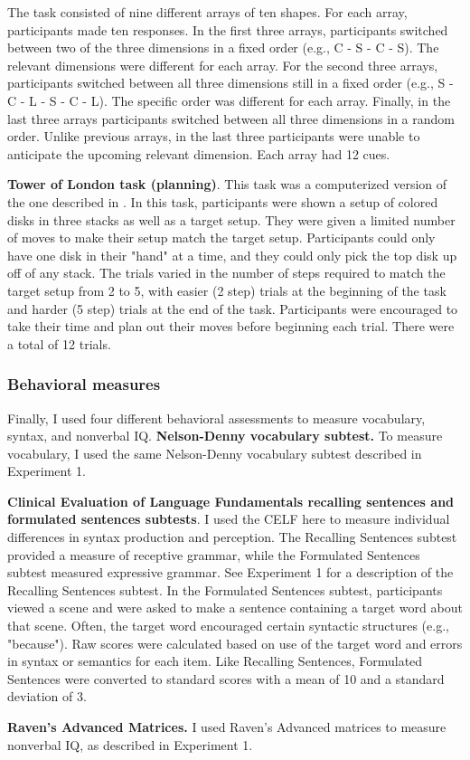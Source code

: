 \documentclass[../dissertation.tex]{subfiles}
\begin{document}
The task consisted of nine different arrays of ten shapes. For each array, participants made ten responses. In the first three arrays, participants switched between two of the three dimensions in a fixed order (e.g., C - S - C - S). The relevant dimensions were different for each array. For the second three arrays, participants switched between all three dimensions still in a fixed order (e.g., S - C - L - S - C - L). The specific order was different for each array. Finally, in the last three arrays participants switched between all three dimensions in a random order. Unlike previous arrays, in the last three participants were unable to anticipate the upcoming relevant dimension. Each array had 12 cues. \par
\textbf{Tower of London task (planning)}. This task was a computerized version of the one described in \citet{Shallice1982}. In this task, participants were shown a setup of colored disks in three stacks as well as a target setup. They were given a limited number of moves to make their setup match the target setup. Participants could only have one disk in their "hand" at a time, and they could only pick the top disk up off of any stack. The trials varied in the number of steps required to match the target setup from 2 to 5, with easier (2 step) trials at the beginning of the task and harder (5 step) trials at the end of the task. Participants were encouraged to take their time and plan out their moves before beginning each trial. There were a total of 12 trials.

\subsubsection{Behavioral measures} 
Finally, I used four different behavioral assessments to measure vocabulary, syntax, and nonverbal IQ.
\textbf{Nelson-Denny vocabulary subtest.} To measure vocabulary, I used the same Nelson-Denny vocabulary subtest described in Experiment 1. \par
\textbf{Clinical Evaluation of Language Fundamentals recalling sentences and formulated sentences subtests}. I used the CELF here to measure individual differences in syntax production and perception. The Recalling Sentences subtest provided a measure of receptive grammar, while the Formulated Sentences subtest measured expressive grammar. See Experiment 1 for a description of the Recalling Sentences subtest. In the Formulated Sentences subtest, participants viewed a scene and were asked to make a sentence containing a target word about that scene. Often, the target word encouraged certain syntactic structures (e.g., "because"). Raw scores were calculated based on use of the target word and errors in syntax or semantics for each item. Like Recalling Sentences, Formulated Sentences were converted to standard scores with a mean of 10 and a standard deviation of 3. \par
\textbf{Raven's Advanced Matrices.} I used Raven's Advanced matrices to measure nonverbal IQ, as described in Experiment 1.
\end{document}
